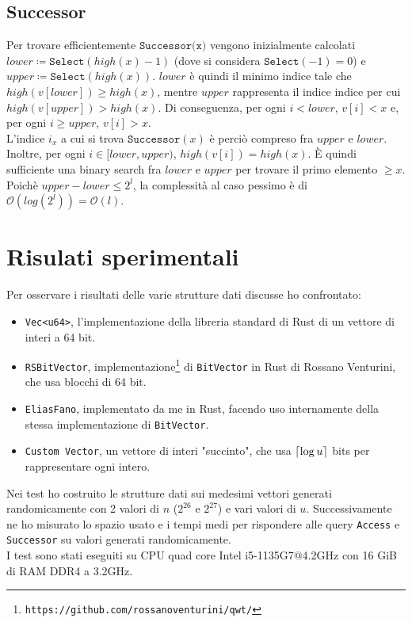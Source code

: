 \documentclass{article}
\DeclarePairedDelimiter\ceil{\lceil}{\rceil}
\newcommand{\ttt}{\texttt}
\newcommand*{\OO}{\ensuremath{\mathcal{O}}}
\newcommand{\clg}[1]{\ensuremath \ceil{\log #1}}
\begin{document}
\subsection{Successor}
Per trovare efficientemente $\ttt{Successor(x)}$ vengono inizialmente calcolati $lower \coloneq \ttt{Select}(high(x) - 1)$ (dove si considera $\ttt{Select}(-1) = 0$) e $upper \coloneq \ttt{Select}(high(x))$.
$lower$ \`e quindi il minimo indice tale che $high(v[lower]) \ge high(x)$, mentre $upper$ rappresenta il indice indice per cui $high(v[upper]) > high(x)$. Di conseguenza, per ogni $i < lower$, $v[i] < x$ e, per ogni $i \ge upper$, $v[i] > x$.\\
L'indice $i_x$ a cui si trova $\ttt{Successor}(x)$ \`e perci\`o compreso fra $upper$ e $lower$. Inoltre, per ogni $i \in [lower, upper)$, $high(v[i]) = high(x)$.
\`E quindi sufficiente una binary search fra $lower$ e $upper$ per trovare il primo elemento $\ge x$.\\
Poich\`e $upper - lower \le 2^l$, la complessit\`a al caso pessimo \`e di $\OO(log (2^l)) = \OO(l)$.

\section{Risulati sperimentali}

Per osservare i risultati delle varie strutture dati discusse ho confrontato:
\begin{itemize}
    \item \ttt{Vec<u64>}, l'implementazione della libreria standard di Rust di un vettore di interi a 64 bit.
    \item \ttt{RSBitVector}, implementazione\footnote{\ttt{https://github.com/rossanoventurini/qwt/}} di \ttt{BitVector} in Rust di Rossano Venturini, che usa blocchi di 64 bit.
    \item \ttt{EliasFano}, implementato da me in Rust, facendo uso internamente della stessa implementazione di \ttt{BitVector}.
    \item \ttt{Custom Vector}, un vettore di interi "succinto", che usa $\clg{u}$ bits per rappresentare ogni intero.
\end{itemize}

Nei test ho costruito le strutture dati sui medesimi vettori generati randomicamente con 2 valori di $n$ ($2^{26}$ e $2^{27}$) e vari valori di $u$. Successivamente ne ho misurato lo spazio usato e i tempi medi per rispondere alle query \ttt{Access} e \ttt{Successor} su valori generati randomicamente. \\
I test sono stati eseguiti su CPU quad core Intel i5-1135G7@4.2GHz con 16 GiB di RAM DDR4 a 3.2GHz.
\end{document}
